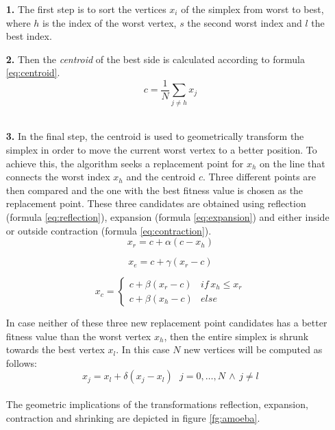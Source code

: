 \documentclass[11pt,a4paper]{report}
\begin{document}
\begin{enumerate}
\item[\textbf{1.}] The first step is to sort the vertices
$x_{i}$ of the simplex from worst to best, where $h$ is the index
of the worst vertex, $s$ the second worst index and $l$ the best
index.
\item[\textbf{2.}] Then the \textit{centroid} of the best side is calculated according
to formula \ref{eq:centroid}.\\
\begin{equation}\label{eq:centroid}
c=\frac{1}{N}\sum_{j\neq h}x_{j}\end{equation}
\\
\item[\textbf{3.}] In the final step, the centroid is used to geometrically
  transform the simplex in order to move the current worst vertex to
a better position. To achieve this, the algorithm seeks a replacement point for $x_{h}$
on the line that connects the worst index $x_{h}$ and the centroid
$c$. Three different points are then compared and the one with the best fitness
value is chosen as the replacement point. These three candidates are obtained
using reflection (formula \ref{eq:reflection}), expansion (formula
\ref{eq:expansion}) and either inside or outside contraction (formula \ref{eq:contraction}). \\
\begin{equation}\label{eq:reflection}
x_{r}=c+\alpha(c-x_{h})
\end{equation}

\begin{equation}\label{eq:expansion}
x_{e}=c+\gamma(x_{r}-c)
\end{equation}

\begin{equation}\label{eq:contraction}
x_{c}=\begin{cases}
c+\beta(x_{r}-c) & if\, x_{h}\leq x_{r}\\
c+\beta(x_{h}-c) & else\end{cases}
\end{equation}

In case neither of these three new replacement point candidates has
a better fitness value than the worst vertex $x_{h}$, then the entire
simplex is shrunk towards the best vertex $x_{l}$. In this case $N$
new vertices will be computed as follows:\\
\begin{equation}
x_{j}=x_{l}+\delta(x_{j}-x_{l})\,\,\,\, j=0,\ldots,N\,\wedge\, j\neq l\end{equation}
\\
The geometric implications of the transformations reflection, expansion,
contraction and shrinking are depicted in figure \ref{fg:amoeba}. 

\end{enumerate}
\end{document}
